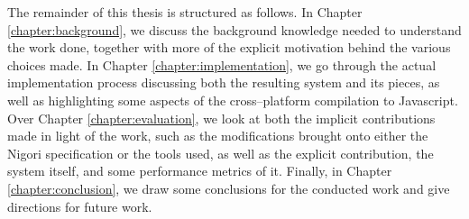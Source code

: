 The remainder of this thesis is structured as follows.
In Chapter \ref{chapter:background}, we discuss the background knowledge needed to understand the work done, together with more of the explicit motivation behind the various choices made.
In Chapter \ref{chapter:implementation}, we go through the actual implementation process discussing both the resulting system and its pieces, as well as highlighting some aspects of the cross--platform compilation to Javascript.
Over Chapter \ref{chapter:evaluation}, we look at both the implicit contributions made in light of the work, such as the modifications brought onto either the Nigori specification or the tools used, as well as the explicit contribution, the system itself, and some performance metrics of it.
Finally, in Chapter \ref{chapter:conclusion}, we draw some conclusions for the conducted work and give directions for future work.
